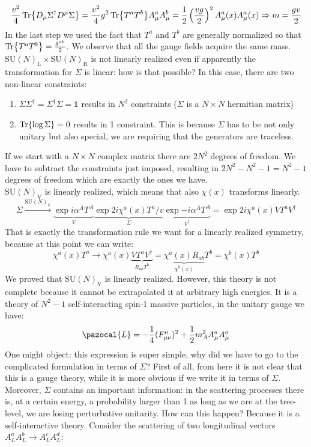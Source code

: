 \documentclass[../main.tex]{subfiles}
\begin{document}
\[
\frac{v^2}{4}\Tr{D_\mu\Sigma^\dagger D^\mu\Sigma}=\frac{v^2}{4}g^2\Tr{T^aT^b}A_\mu^aA_\mu^b=\frac{1}{2}\left(\frac{vg}{2}\right)^2A_\mu^a(x)A_\mu^a(x)\Rightarrow m=\frac{gv}{2}
\]
In the last step we used the fact that $T^a$ and $T^b$ are generally normalized so that $\Tr{T^aT^b}=\frac{\delta^{ab}}{2}$. We observe that all the gauge fields acquire the same mass.\\
SU$(N)_{\text{L}}\times$SU$(N)_{\text{R}}$ is not linearly realized even if apparently the transformation for $\Sigma$ is linear: how is that possible? In this case, there are two non-linear constraints:
\begin{enumerate}
    \item $\Sigma\Sigma^\dagger=\Sigma^\dagger\Sigma=\mathbb{1}$ results in $N^2$ constraints ($\Sigma$ is a $N\times N$ hermitian matrix)
    \item $\Tr{\log\Sigma}=0$ results in 1 constraint. This is because $\Sigma$ has to be not only unitary but also special, we are requiring that the generators are traceless.
\end{enumerate}
If we start with a $N\times N$ complex matrix there are $2N^2$ degrees of freedom. We have to subtract the constraints just imposed, resulting in $2N^2-N^2-1=N^2-1$ degrees of freedom which are exactly the ones we have.\\
SU$(N)_{\text{V}}$ is linearly realized, which means that also $\chi(x)$ transforms linearly.
\[
\Sigma\xrightarrow[]{\text{SU}(N)_{\text{V}}}\underbrace{\exp{i\alpha^AT^A}}_{V}\underbrace{\exp{2i\chi^a(x)T^a/v}}_{\Sigma}\underbrace{\exp{-i\alpha^AT^A}}_{V^\dagger}=\exp{2i\chi^a(x)VT^aV^\dagger}
\]
That is exactly the transformation rule we want for a linearly realized symmetry, because at this point we can write:
\[
\chi^a(x)T^a\to\chi^a(x)\underbrace{VT^aV^\dagger}_{R_{ab}T^b}=\underbrace{\chi^a(x)R_{ab}}_{\chi^b(x)}T^b=\chi^b(x)T^b
\]
We proved that SU$(N)_{\text{V}}$ is linearly realized. However, this theory is not complete because it cannot be extrapolated it at arbitrary high energies. It is a theory of $N^2-1$ self-interacting spin-1 massive particles, in the unitary gauge we have:
\[
\pazocal{L}=-\frac{1}{4}(F_{\mu\nu}^a)^2+\frac{1}{2}m_A^2A_\mu^aA_\mu^a
\]
One might object: this expression is super simple, why did we have to go to the complicated formulation in terms of $\Sigma$? First of all, from here it is not clear that this is a gauge theory, while it is more obvious if we write it in terms of $\Sigma$. Moreover, $\Sigma$ contains an important information: in the scattering processes there is, at a certain energy, a probability larger than 1 as long as we are at the tree-level, we are losing perturbative unitarity. How can this happen? Because it is a self-interactive theory. Consider the scattering of two longitudinal vectors $A_L^aA_L^b\to A_L^cA_L^d$: 
\end{document}

